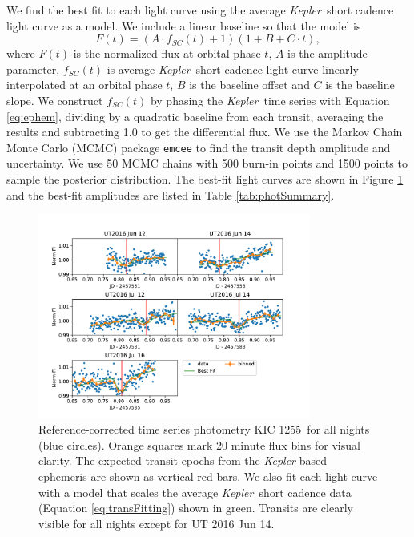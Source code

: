 \documentclass[preprint]{aastex61}
\newcommand{\shStar}{KIC 1255}
\newcommand{\kepler}{{\it Kepler}}
\begin{document}
We find the best fit to each light curve using the average \kepler\ short cadence light curve as a model.
We include a linear baseline so that the model is
\begin{equation}\label{eq:transFitting}
F(t) = \left(A \cdot f_{SC}(t) + 1 \right)  (1 + B + C \cdot t),
\end{equation}
where $F(t)$ is the normalized flux at orbital phase $t$, $A$ is the amplitude parameter, $f_{SC}(t)$ is average \kepler\ short cadence light curve linearly interpolated at an orbital phase $t$, $B$ is the baseline offset and $C$ is the baseline slope.
We construct $f_{SC}(t)$ by phasing the \kepler\ time series with Equation \ref{eq:ephem}, dividing by a quadratic baseline from each transit, averaging the results and subtracting 1.0 to get the differential flux.
We use the Markov Chain Monte Carlo (MCMC) package \texttt{emcee} \citep{foreman-mackey2013emcee} to find the transit depth amplitude and uncertainty.
We use 50 MCMC chains with 500 burn-in points and 1500 points to sample the posterior distribution.
The best-fit light curves are shown in Figure \ref{fig:allNightrefCorrect} and the best-fit amplitudes are listed in Table \ref{tab:photSummary}.

\begin{figure}
\begin{centering}
\includegraphics[width=0.8\textwidth]{images/all_kic1255_phot/all_kic1255_refcor.pdf}
\caption{Reference-corrected time series photometry \shStar\ for all nights (blue circles).
Orange squares mark 20 minute flux bins for visual clarity.
The expected transit epochs from the \kepler-based ephemeris \citep{vanWerkhoven2014} are shown as vertical red bars.
We also fit each light curve with a model that scales the average \kepler\ short cadence data (Equation \ref{eq:transFitting}) shown in green.
Transits are clearly visible for all nights except for UT 2016 Jun 14.}\label{fig:allNightrefCorrect}
\end{centering}
\end{figure}
\end{document}
